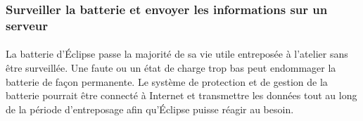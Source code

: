 		\subsubsection{Surveiller la batterie et envoyer les informations sur un serveur}
		
			\paragraph{}
			La batterie d'Éclipse passe la majorité de sa vie utile entreposée à l'atelier sans être surveillée. Une faute ou un état de charge trop bas peut endommager la batterie de façon permanente. Le système de protection et de gestion de la batterie pourrait être connecté à Internet et transmettre les données tout au long de la période d'entreposage afin qu'Éclipse puisse réagir au besoin.  
